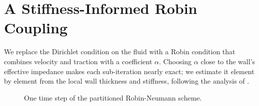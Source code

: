 \chapter{A Stiffness-Informed Robin Coupling}
\label{ch:method}

We replace the Dirichlet condition on the fluid with a Robin condition that combines velocity
and traction with a coefficient $\alpha$. Choosing $\alpha$ close to the wall's effective
impedance makes each sub-iteration nearly exact; we estimate it element by element from the
local wall thickness and stiffness, following the analysis of \citet{badia2008}.

\begin{figure}[htbp]
  \centering
  \caption{One time step of the partitioned Robin-Neumann scheme.}
  \label{fig:loop}
\end{figure}
